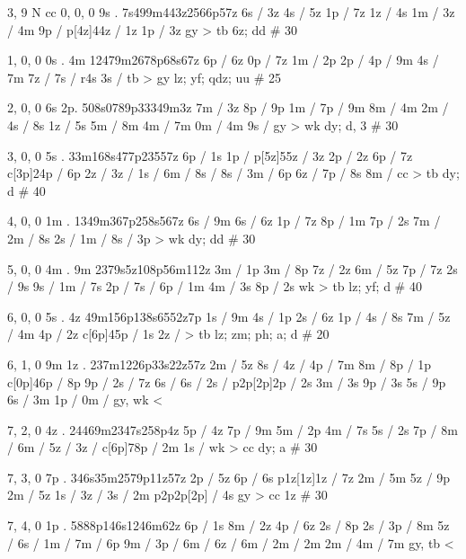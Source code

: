3, 9
N
cc
0, 0, 0
9s . 
7s499m443z2566p57z
6s / 3z 
4s / 5z 
1p / 7z 
1z / 4s 
1m / 
3z / 4m 
9p / 
p[4z]44z / 1z 
1p / 3z 
gy > tb 
6z; dd # 30 

1, 0, 0
0s . 4m 
12479m2678p68s67z 
6p / 6z 
0p / 7z 
1m / 2p 
2p / 
4p / 9m 
4s / 7m 
7z / 
7s / r4s 
3s / 
tb > gy 
lz; yf; qdz; uu # 25

2, 0, 0 
6s 2p.
508s0789p33349m3z 
7m / 3z 
8p / 9p 
1m / 
7p / 9m 
8m / 4m 
2m / 
4s / 8s 
1z / 5s 
5m / 8m 
4m / 7m 
0m / 4m 
9s /  
gy > wk
dy; d, 3 # 30 

3, 0, 0
5s .
33m168s477p23557z 
6p / 1s 
1p / 
p[5z]55z / 3z 
2p / 2z 
6p / 7z 
c[3p]24p / 6p 
2z / 
3z / 
1s / 
6m / 
8s / 
8s / 
3m / 6p 
6z / 
7p / 8s 
8m / 
cc > tb 
dy; d # 40 

4, 0, 0 
1m . 
1349m367p258s567z 
6s / 9m 
6s / 6z 
1p / 7z 
8p / 1m 
7p / 2s 
7m / 
2m / 8s 
2s / 
1m / 
8s / 3p 
> wk 
dy; dd # 30 

5, 0, 0 
4m . 9m 
2379s5z108p56m112z 
3m / 1p 
3m / 8p 
7z / 2z 
6m / 5z 
7p / 7z 
2s / 9s 
9s / 
1m / 7s 
2p / 
7s / 
6p / 1m 
4m / 3s 
8p / 2s 
wk > tb 
lz; yf; d # 40 

6, 0, 0
5s . 4z 
49m156p138s6552z7p 
1s / 9m 
4s / 1p 
2s / 6z 
1p / 
4s / 8s 
7m / 
5z / 4m 
4p / 2z
c[6p]45p / 1s 
2z / 
> tb 
lz; zm; ph; a; d # 20 

6, 1, 0 
9m 1z . 
237m1226p33s22z57z 
2m / 5z 
8s / 
4z / 
4p / 7m 
8m / 
8p / 1p 
c[0p]46p / 8p 
9p / 
2s / 7z 
6s / 
6s / 
2s / 
p2p[2p]2p / 2s 
3m / 3s 
9p / 3s 
5s / 9p 
6s / 3m 
1p / 
0m / 
gy, wk < 

7, 2, 0
4z . 
24469m2347s258p4z 
5p / 4z 
7p / 9m 
5m / 2p 
4m / 7s 
5s / 2s 
7p / 
8m / 
6m / 
5z / 
3z / 
c[6p]78p / 2m 
1s / 
wk > cc 
dy; a # 30 

7, 3, 0 
7p . 
346s35m2579p11z57z 
2p / 5z 
6p / 6s 
p1z[1z]1z / 7z 
2m / 5m 
5z / 9p 
2m / 5z 
1s / 
3z / 
3s / 2m 
p2p2p[2p] / 4s 
gy > cc 
1z # 30 

7, 4, 0 
1p . 
5888p146s1246m62z 
6p / 1s 
8m / 2z 
4p / 6z 
2s / 8p 
2s / 
3p / 8m 
5z / 
6s / 
1m / 
7m / 6p 
9m / 
3p / 
6m / 
6z / 
6m / 
2m / 2m 
2m / 
4m / 7m 
gy, tb <
